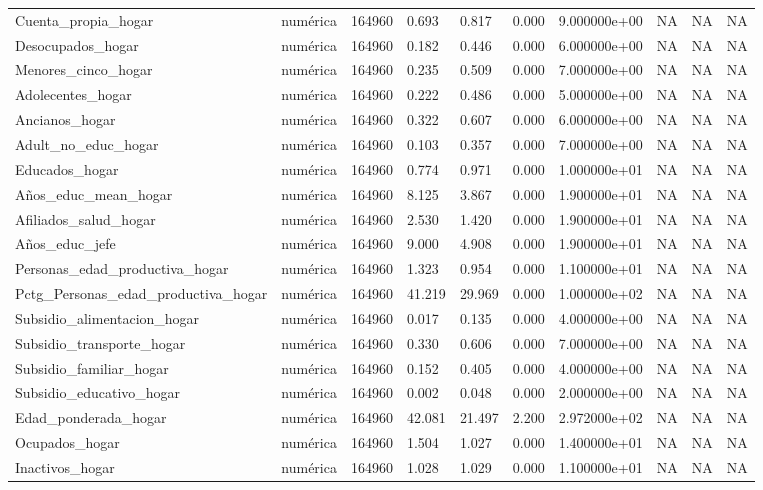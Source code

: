 \begin{longtable}[t]{llllllllll}
Cuenta\_propia\_hogar & numérica & 164960 & 0.693 & 0.817 & 0.000 & 9.000000e+00 & NA & NA & NA\\
Desocupados\_hogar & numérica & 164960 & 0.182 & 0.446 & 0.000 & 6.000000e+00 & NA & NA & NA\\
Menores\_cinco\_hogar & numérica & 164960 & 0.235 & 0.509 & 0.000 & 7.000000e+00 & NA & NA & NA\\
Adolecentes\_hogar & numérica & 164960 & 0.222 & 0.486 & 0.000 & 5.000000e+00 & NA & NA & NA\\
Ancianos\_hogar & numérica & 164960 & 0.322 & 0.607 & 0.000 & 6.000000e+00 & NA & NA & NA\\
Adult\_no\_educ\_hogar & numérica & 164960 & 0.103 & 0.357 & 0.000 & 7.000000e+00 & NA & NA & NA\\
Educados\_hogar & numérica & 164960 & 0.774 & 0.971 & 0.000 & 1.000000e+01 & NA & NA & NA\\
Años\_educ\_mean\_hogar & numérica & 164960 & 8.125 & 3.867 & 0.000 & 1.900000e+01 & NA & NA & NA\\
Afiliados\_salud\_hogar & numérica & 164960 & 2.530 & 1.420 & 0.000 & 1.900000e+01 & NA & NA & NA\\
Años\_educ\_jefe & numérica & 164960 & 9.000 & 4.908 & 0.000 & 1.900000e+01 & NA & NA & NA\\
Personas\_edad\_productiva\_hogar & numérica & 164960 & 1.323 & 0.954 & 0.000 & 1.100000e+01 & NA & NA & NA\\
Pctg\_Personas\_edad\_productiva\_hogar & numérica & 164960 & 41.219 & 29.969 & 0.000 & 1.000000e+02 & NA & NA & NA\\
Subsidio\_alimentacion\_hogar & numérica & 164960 & 0.017 & 0.135 & 0.000 & 4.000000e+00 & NA & NA & NA\\
Subsidio\_transporte\_hogar & numérica & 164960 & 0.330 & 0.606 & 0.000 & 7.000000e+00 & NA & NA & NA\\
Subsidio\_familiar\_hogar & numérica & 164960 & 0.152 & 0.405 & 0.000 & 4.000000e+00 & NA & NA & NA\\
Subsidio\_educativo\_hogar & numérica & 164960 & 0.002 & 0.048 & 0.000 & 2.000000e+00 & NA & NA & NA\\
Edad\_ponderada\_hogar & numérica & 164960 & 42.081 & 21.497 & 2.200 & 2.972000e+02 & NA & NA & NA\\
Ocupados\_hogar & numérica & 164960 & 1.504 & 1.027 & 0.000 & 1.400000e+01 & NA & NA & NA\\
Inactivos\_hogar & numérica & 164960 & 1.028 & 1.029 & 0.000 & 1.100000e+01 & NA & NA & NA\\

\end{longtable}
